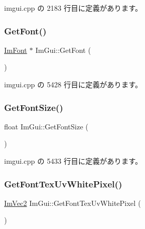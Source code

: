 imgui.\+cpp の 2183 行目に定義があります。

\mbox{\label{namespace_im_gui_a43cf349576e20fac4a1300269320ad8f}} 
\subsubsection{\texorpdfstring{Get\+Font()}{GetFont()}}
{\footnotesize\ttfamily \mbox{\hyperlink{struct_im_font}{Im\+Font}} $\ast$ Im\+Gui\+::\+Get\+Font (\begin{DoxyParamCaption}{ }\end{DoxyParamCaption})}



 imgui.\+cpp の 5428 行目に定義があります。

\mbox{\label{namespace_im_gui_ac592ae8e0aa4a1a06502ec7872bc8da8}} 
\subsubsection{\texorpdfstring{Get\+Font\+Size()}{GetFontSize()}}
{\footnotesize\ttfamily float Im\+Gui\+::\+Get\+Font\+Size (\begin{DoxyParamCaption}{ }\end{DoxyParamCaption})}



 imgui.\+cpp の 5433 行目に定義があります。

\mbox{\label{namespace_im_gui_a3092da6abc1d04f3287c084435dc6026}} 
\subsubsection{\texorpdfstring{Get\+Font\+Tex\+Uv\+White\+Pixel()}{GetFontTexUvWhitePixel()}}
{\footnotesize\ttfamily \mbox{\hyperlink{struct_im_vec2}{Im\+Vec2}} Im\+Gui\+::\+Get\+Font\+Tex\+Uv\+White\+Pixel (\begin{DoxyParamCaption}{ }\end{DoxyParamCaption})}



